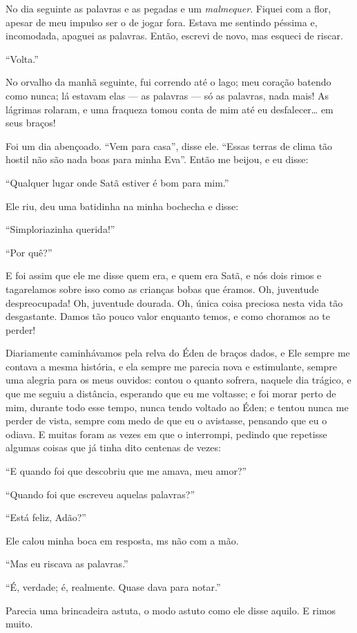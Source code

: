 No dia seguinte as palavras e as pegadas e um \textit{malmequer}. Fiquei com a
flor, apesar de meu impulso ser o de jogar fora. Estava me sentindo péssima e,
incomodada, apaguei as palavras. Então, escrevi de novo, mas
esqueci de riscar.

“Volta.”

No orvalho da manhã seguinte, fui correndo até o lago; meu coração batendo como
nunca; lá estavam elas --- as palavras --- só as palavras, nada mais!
As lágrimas rolaram, e uma fraqueza tomou conta de mim até eu desfalecer\ldots{} em
seus braços!

Foi um dia abençoado. “Vem para casa”, disse ele. “Essas terras de clima tão hostil
não são nada boas para minha Eva”. Então me beijou, e eu disse:

“Qualquer lugar onde Satã estiver é bom para mim.”

Ele riu, deu uma batidinha na minha bochecha e disse:

“Simploriazinha querida!”

“Por quê?” 

E foi assim que ele me disse quem era, e quem era Satã, e nós dois rimos e tagarelamos
sobre isso como as crianças bobas que éramos. Oh, juventude despreocupada! Oh,
juventude dourada. Oh, única coisa preciosa nesta vida tão desgastante. Damos
tão pouco valor enquanto temos, e como choramos ao te perder!

Diariamente caminhávamos pela relva do Éden de braços dados, e
Ele sempre me contava a mesma história, e ela sempre me parecia nova e
estimulante, sempre uma alegria para os meus ouvidos: contou o quanto sofrera,
naquele dia trágico, e que me seguiu a distância, esperando que eu me voltasse; e
foi morar perto de mim, durante todo esse tempo, nunca tendo voltado ao
Éden; e tentou nunca me perder de vista, sempre com medo de que eu o avistasse,
pensando que eu o odiava. E muitas foram as vezes em que o interrompi, pedindo que
repetisse algumas coisas que já tinha dito centenas de vezes:

“E quando foi que descobriu que me amava, meu amor?”

“Quando foi que escreveu aquelas palavras?”

“Está feliz, Adão?”

Ele calou minha boca em resposta, ms não com a mão.

“Mas eu riscava as palavras.”

“É, verdade; é, realmente. Quase dava para notar.”

Parecia uma brincadeira astuta, o modo astuto como ele disse aquilo. E rimos muito.

